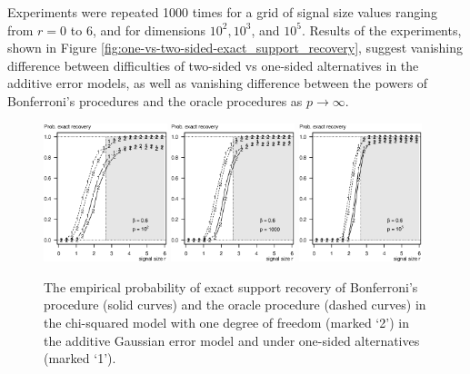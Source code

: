 Experiments were repeated 1000 times for a grid of signal size values ranging from $r=0$ to $6$, and for dimensions $10^2, 10^3$, and $10^5$.
Results of the experiments, shown in Figure \ref{fig:one-vs-two-sided-exact_support_recovery}, suggest vanishing difference between difficulties of two-sided vs one-sided alternatives in the additive error models, as well as vanishing difference between the powers of Bonferroni's procedures and the oracle procedures as $p\to\infty$.

\begin{figure}
      \centering
      \includegraphics[width=0.32\textwidth]{./sim_one-vs-two-sided/exact_recovery_one-vs-two-sided_beta06_p100.eps}
      \includegraphics[width=0.32\textwidth]{./sim_one-vs-two-sided/exact_recovery_one-vs-two-sided_beta06_p1000.eps}
      \includegraphics[width=0.32\textwidth]{./sim_one-vs-two-sided/exact_recovery_one-vs-two-sided_beta06_p100000.eps}
      \caption{The empirical probability of exact support recovery of Bonferroni's procedure (solid curves) and the oracle procedure (dashed curves) in the chi-squared model with one degree of freedom (marked `2') in the additive Gaussian error model and under one-sided alternatives (marked `1'). 
}
\end{figure}
